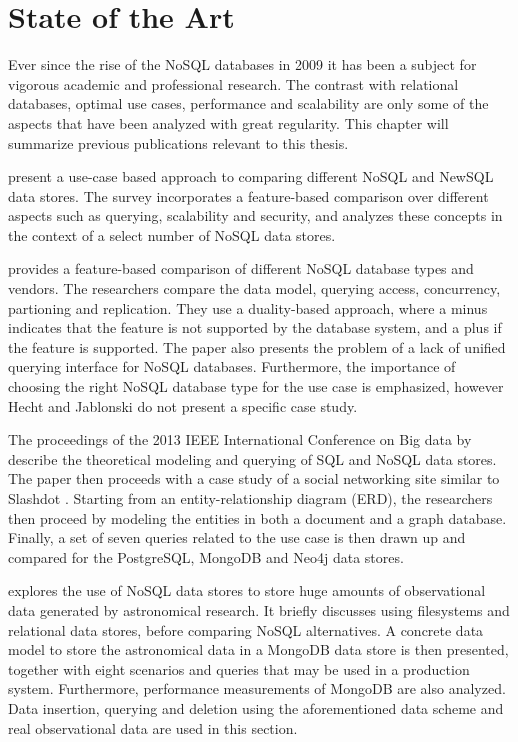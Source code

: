 \chapter{State of the Art}
\label{ch:state-of-the-art}

Ever since the rise of the NoSQL databases in 2009 \autocite{Sadalage2012} it has been a subject for vigorous academic and professional research. The contrast with relational databases, optimal use cases, performance and scalability are only some of the aspects that have been analyzed with great regularity. This chapter will summarize previous publications relevant to this thesis.


\textcite{Grolinger2013} present a use-case based approach to comparing different NoSQL and NewSQL data stores. The survey incorporates a feature-based comparison over different aspects such as querying, scalability and security, and analyzes these concepts in the context of a select number of NoSQL data stores.

\textcite{Hecht2011} provides a feature-based comparison of different NoSQL database types and vendors. The researchers compare the data model, querying access, concurrency, partioning and replication. They use a duality-based approach, where a minus indicates that the feature is not supported by the database system, and a plus if the feature is supported. The paper also presents the problem of a lack of unified querying interface for NoSQL databases. Furthermore, the importance of choosing the right NoSQL database type for the use case is emphasized, however Hecht and Jablonski do not present a specific case study.

The proceedings of the 2013 IEEE International Conference on Big data by \textcite{Kaur2013} describe the theoretical modeling and querying of SQL and NoSQL data stores. The paper then proceeds with a case study of a social networking site similar to Slashdot \autocite{Malda1997}. Starting from an entity-relationship diagram (ERD), the researchers then proceed by modeling the entities in both a document and a graph database. Finally, a set of seven queries related to the use case is then drawn up and compared for the PostgreSQL, MongoDB and Neo4j data stores.

\textcite{Zhao2015} explores the use of NoSQL data stores to store huge amounts of observational data generated by astronomical research. It briefly discusses using filesystems and relational data stores, before comparing NoSQL alternatives. A concrete data model to store the astronomical data in a MongoDB data store is then presented, together with eight scenarios and queries that may be used in a production system.
Furthermore, performance measurements of MongoDB are also analyzed. Data insertion, querying and deletion using the aforementioned data scheme and real observational data are used in this section.


